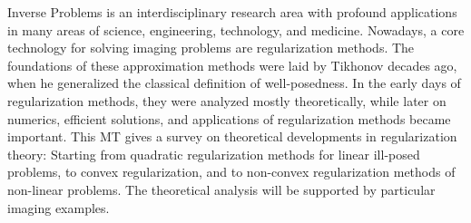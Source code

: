 Inverse Problems is an interdisciplinary research
area with profound applications in many areas of science,
engineering, technology, and medicine.
Nowadays, a core technology for solving imaging problems are
regularization methods. The foundations of these
approximation methods were laid by Tikhonov decades ago, when he
generalized the classical definition of well-posedness. 
In the early days of regularization methods, they were analyzed
mostly theoretically, while later on numerics, efficient solutions, 
and applications of regularization methods became important.
This MT gives a survey on theoretical developments in regularization 
theory: Starting from quadratic regularization methods for linear ill-posed 
problems, to convex regularization, and to non-convex regularization methods 
of non-linear problems. 
The theoretical analysis will be supported by particular 
imaging examples.  



